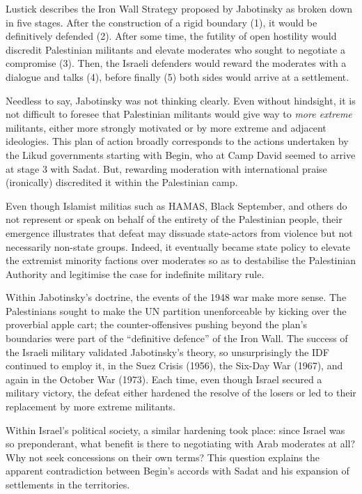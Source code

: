 \documentclass[letterpaper,12pt,twoside]{article} %
\begin{document}
\begin{multicols}{2}
Lustick describes the Iron Wall Strategy proposed by Jabotinsky as broken down in five stages. After the construction of a rigid boundary (1), it would be definitively defended (2). After some time, the futility of open hostility would discredit Palestinian militants and elevate moderates who sought to negotiate a compromise (3). Then, the Israeli defenders would reward the moderates with a dialogue and talks (4), before finally (5) both sides would arrive at a settlement.\autocite{lustick2019paradigm} 

Needless to say, Jabotinsky was not thinking clearly. Even without hindsight, it is not difficult to foresee that Palestinian militants would give way to \textit{more extreme} militants, either more strongly motivated or by more extreme and adjacent ideologies. This plan of action broadly corresponds to the actions undertaken by the Likud governments starting with Begin, who at Camp David seemed to arrive at stage 3 with Sadat. But, rewarding moderation with international praise (ironically) discredited it within the Palestinian camp.

Even though Islamist militias such as HAMAS, Black September, and others do not represent or speak on behalf of the entirety of the Palestinian people, their emergence illustrates that defeat may dissuade state-actors from violence but not necessarily non-state groups. Indeed, it eventually became state policy to elevate the extremist minority factions over moderates so as to destabilise the Palestinian Authority and legitimise the case for indefinite military rule.

Within Jabotinsky's doctrine, the events of the 1948 war make more sense. The Palestinians sought to make the UN partition unenforceable by kicking over the proverbial apple cart; the counter-offensives pushing beyond the plan's boundaries were part of the ``definitive defence'' of the Iron Wall. The success of the Israeli military validated Jabotinsky's theory, so unsurprisingly the IDF continued to employ it, in the Suez Crisis (1956), the Six-Day War (1967), and again in the October War (1973). Each time, even though Israel secured a military victory, the defeat either hardened the resolve of the losers or led to their replacement by more extreme militants.

Within Israel's political society, a similar hardening took place: since Israel was so preponderant, what benefit is there to negotiating with Arab moderates at all? Why not seek concessions on their own terms? This question explains the apparent contradiction between Begin's accords with Sadat and his expansion of settlements in the territories.


\end{multicols}
\end{document}
